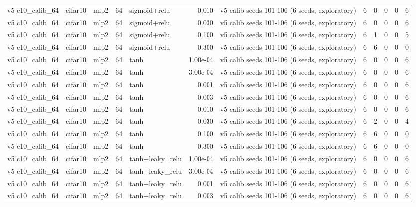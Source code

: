 \begin{table}[htbp]
{\begin{tabular}{@{}lllrlrlrrrrr@{}}
v5 c10\_calib\_64 & cifar10 & mlp2 & 64 & sigmoid+relu & 0.010 & v5 calib seeds 101-106 (6 seeds, exploratory) & 6 & 0 & 0 & 0 & 6 \\
v5 c10\_calib\_64 & cifar10 & mlp2 & 64 & sigmoid+relu & 0.030 & v5 calib seeds 101-106 (6 seeds, exploratory) & 6 & 0 & 0 & 0 & 6 \\
v5 c10\_calib\_64 & cifar10 & mlp2 & 64 & sigmoid+relu & 0.100 & v5 calib seeds 101-106 (6 seeds, exploratory) & 6 & 1 & 0 & 0 & 5 \\
v5 c10\_calib\_64 & cifar10 & mlp2 & 64 & sigmoid+relu & 0.300 & v5 calib seeds 101-106 (6 seeds, exploratory) & 6 & 6 & 0 & 0 & 0 \\
v5 c10\_calib\_64 & cifar10 & mlp2 & 64 & tanh & 1.00e-04 & v5 calib seeds 101-106 (6 seeds, exploratory) & 6 & 0 & 0 & 0 & 6 \\
v5 c10\_calib\_64 & cifar10 & mlp2 & 64 & tanh & 3.00e-04 & v5 calib seeds 101-106 (6 seeds, exploratory) & 6 & 0 & 0 & 0 & 6 \\
v5 c10\_calib\_64 & cifar10 & mlp2 & 64 & tanh & 0.001 & v5 calib seeds 101-106 (6 seeds, exploratory) & 6 & 0 & 0 & 0 & 6 \\
v5 c10\_calib\_64 & cifar10 & mlp2 & 64 & tanh & 0.003 & v5 calib seeds 101-106 (6 seeds, exploratory) & 6 & 0 & 0 & 0 & 6 \\
v5 c10\_calib\_64 & cifar10 & mlp2 & 64 & tanh & 0.010 & v5 calib seeds 101-106 (6 seeds, exploratory) & 6 & 0 & 0 & 0 & 6 \\
v5 c10\_calib\_64 & cifar10 & mlp2 & 64 & tanh & 0.030 & v5 calib seeds 101-106 (6 seeds, exploratory) & 6 & 2 & 0 & 0 & 4 \\
v5 c10\_calib\_64 & cifar10 & mlp2 & 64 & tanh & 0.100 & v5 calib seeds 101-106 (6 seeds, exploratory) & 6 & 6 & 0 & 0 & 0 \\
v5 c10\_calib\_64 & cifar10 & mlp2 & 64 & tanh & 0.300 & v5 calib seeds 101-106 (6 seeds, exploratory) & 6 & 6 & 0 & 0 & 0 \\
v5 c10\_calib\_64 & cifar10 & mlp2 & 64 & tanh+leaky\_relu & 1.00e-04 & v5 calib seeds 101-106 (6 seeds, exploratory) & 6 & 0 & 0 & 0 & 6 \\
v5 c10\_calib\_64 & cifar10 & mlp2 & 64 & tanh+leaky\_relu & 3.00e-04 & v5 calib seeds 101-106 (6 seeds, exploratory) & 6 & 0 & 0 & 0 & 6 \\
v5 c10\_calib\_64 & cifar10 & mlp2 & 64 & tanh+leaky\_relu & 0.001 & v5 calib seeds 101-106 (6 seeds, exploratory) & 6 & 0 & 0 & 0 & 6 \\
v5 c10\_calib\_64 & cifar10 & mlp2 & 64 & tanh+leaky\_relu & 0.003 & v5 calib seeds 101-106 (6 seeds, exploratory) & 6 & 0 & 0 & 0 & 6 \\

\end{tabular}}
\end{table}
